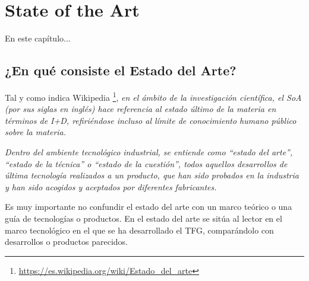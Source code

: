 \chapter{State of the Art}

En este capítulo...


\section{¿En qué consiste el Estado del Arte?}

Tal y como indica Wikipedia \footnote{\url{https://es.wikipedia.org/wiki/Estado_del_arte}}, \textit{en el ámbito de la investigación científica, el SoA (por sus siglas en inglés) hace referencia al estado último de la materia en términos de I+D, refiriéndose incluso al límite de conocimiento humano público sobre la materia.}

\textit{Dentro del ambiente tecnológico industrial, se entiende como ``estado del arte'', ``estado de la técnica'' o ``estado de la cuestión'', todos aquellos desarrollos de última tecnología realizados a un producto, que han sido probados en la industria y han sido acogidos y aceptados por diferentes fabricantes.}


Es muy importante no confundir el estado del arte con un marco teórico o una guía de tecnologías o productos. En el estado del arte se sitúa al lector en el marco tecnológico en el que se ha desarrollado el TFG, comparándolo con desarrollos o productos parecidos.